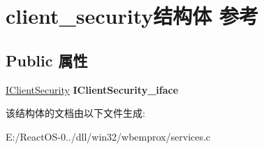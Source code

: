 \hypertarget{structclient__security}{}\section{client\+\_\+security结构体 参考}
\label{structclient__security}
\subsection*{Public 属性}
\begin{DoxyCompactItemize}
\item 
\mbox{\label{structclient__security_aa3e331f17256e5b4778e4f9ea10ec89f}} 
\hyperlink{interface_i_client_security}{I\+Client\+Security} {\bfseries I\+Client\+Security\+\_\+iface}
\end{DoxyCompactItemize}


该结构体的文档由以下文件生成\+:\begin{DoxyCompactItemize}
\item 
E\+:/\+React\+O\+S-\/0../dll/win32/wbemprox/services.\+c\end{DoxyCompactItemize}
